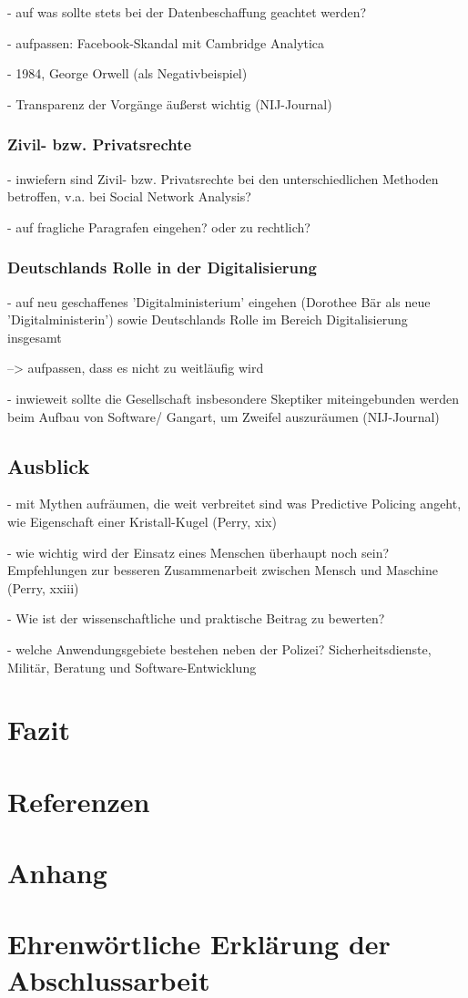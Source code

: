 \documentclass[a4paper,12pt,parskip,bibtotoc,liststotoc]{article}
\begin{document}
- auf was sollte stets bei der Datenbeschaffung geachtet werden?

- aufpassen: Facebook-Skandal mit Cambridge Analytica

- 1984, George Orwell (als Negativbeispiel)

- Transparenz der Vorgänge äußerst wichtig (NIJ-Journal)

\subsubsection{Zivil- bzw. Privatsrechte}
- inwiefern sind Zivil- bzw. Privatsrechte bei den unterschiedlichen Methoden betroffen, v.a. bei Social Network Analysis? 

- auf fragliche Paragrafen eingehen? oder zu rechtlich? 


\subsubsection{Deutschlands Rolle in der Digitalisierung}

- auf neu geschaffenes 'Digitalministerium' eingehen (Dorothee Bär als neue 'Digitalministerin') sowie Deutschlands Rolle im Bereich Digitalisierung insgesamt 

--> aufpassen, dass es nicht zu weitläufig wird

- inwieweit sollte die Gesellschaft insbesondere Skeptiker miteingebunden werden beim Aufbau von Software/ Gangart, um Zweifel auszuräumen (NIJ-Journal)



\subsection{Ausblick}
- mit Mythen aufräumen, die weit verbreitet sind was Predictive Policing angeht, wie Eigenschaft einer Kristall-Kugel (Perry, xix)

- wie wichtig wird der Einsatz eines Menschen überhaupt noch sein? Empfehlungen zur besseren Zusammenarbeit zwischen Mensch und Maschine (Perry, xxiii) 

- Wie ist der wissenschaftliche und praktische Beitrag zu bewerten?

- welche Anwendungsgebiete bestehen neben der Polizei? Sicherheitsdienste, Militär, Beratung und Software-Entwicklung

\newpage
\section{Fazit}

\section*{Referenzen}

\section{Anhang}

\section{Ehrenwörtliche Erklärung der Abschlussarbeit}
\end{document}
